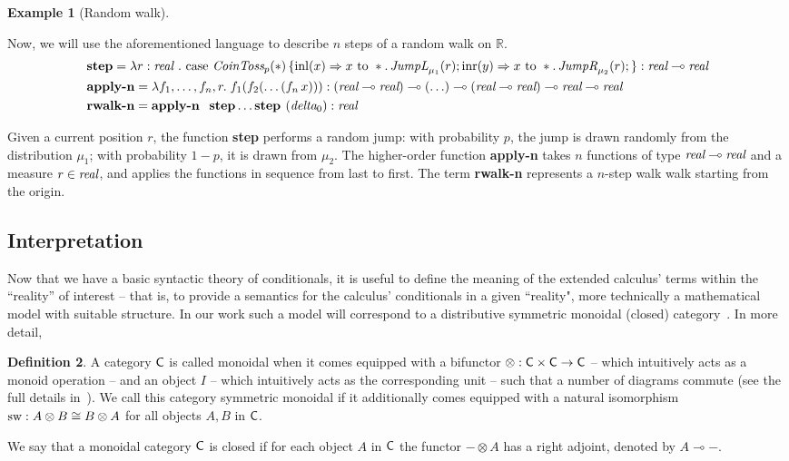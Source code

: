 \documentclass[10pt,a4paper]{amsart}
\theoremstyle{definition}
\newtheorem{definition}{Definition}[section]
\theoremstyle{definition}
\newtheorem{example}[definition]{Example}
\theoremstyle{definition}
\theoremstyle{definition}
\theoremstyle{definition}
\theoremstyle{definition}
\begin{document}
\begin{example}[Random walk] \label{ex:random_walk_prob}

Now, we will use the aforementioned language to describe $n$ steps of a random walk on $\mathbb{R}$.
\begin{align*}
  &\textbf{step} =  \lambda r: \emph{real } .\
  \text{case } \emph{CoinToss}_p(*) \,
  \{\mathrm{inl}(x) \Rightarrow x \text{ to } \ast.\, \emph{JumpL}_{\mu_1}(r) 
  ; \mathrm{inr}(y) \Rightarrow x \text{ to } \ast.\, \emph{JumpR}_{\mu_2}(r);\}
  : \textit{real} \multimap \textit{real}   \\
  & \textbf{apply-n} = \lambda f_1, \dots, f_n, r.\; f_1(f_2(\dots(f_n\,x))): (\emph{real} \multimap \emph{real}) \multimap (\ldots ) \multimap (\emph{real} \multimap \emph{real}) \multimap \emph{real} \multimap \emph{real} \\
  & \textbf{rwalk-n} = \textbf{apply-n } \textbf{ step} \ldots \textbf{step } (\emph{delta}_0) : \emph{real}
\end{align*}


Given a current position $r$, the function \textbf{step} performs a random jump: with probability $p$, the jump is drawn randomly from the distribution \( \mu_1 \); with probability $1-p$, it is drawn from $\mu_2$.
The higher-order function \textbf{apply-n} takes $ n $  functions of type \( \emph{real} \multimap \emph{real} \) and a measure \( r \in \emph{real} \), and applies the functions in sequence from last to first.
The term \textbf{rwalk-n} represents a $n$-step walk  walk starting from the origin.


\end{example}
 


 \subsection{Interpretation}

Now that we have a basic syntactic theory of conditionals, it is useful to
define the meaning of the extended calculus' terms within the ``reality'' of
interest -- that is, to provide a semantics for the calculus' conditionals in a
given ``reality", more technically a mathematical model with suitable
structure. In our work such a model will correspond to a distributive symmetric
monoidal (closed) category~\cite{maclane13}. In more detail, 
\begin{definition}
        A category $\mathsf{C}$ is called monoidal when it comes equipped with a
        bifunctor $\otimes: \mathsf{C} \times \mathsf{C} \to \mathsf{C}$ -- which intuitively
        acts as a monoid operation -- and an object $I$ -- which intuitively
        acts as the corresponding unit -- such that a number of diagrams
        commute (see the full details in~\cite{maclane13}). We call this
        category symmetric monoidal if it additionally comes equipped with a
        natural isomorphism $\mathrm{sw} : A \otimes B \cong B \otimes A$ for all
        objects $A,B$ in $\mathsf{C}$.

        We say that a monoidal category $\mathsf{C}$ is closed if for each object
        $A$ in $\mathsf{C}$ the functor $- \otimes A$ has a right adjoint,
        denoted by $A \multimap -$. 
\end{definition}
\end{document}
